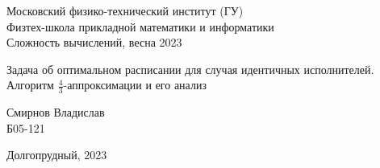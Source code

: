\begin{center}

    \normalsize{Московский физико-технический институт (ГУ)}\\
    \normalsize{Физтех-школа прикладной математики и информатики}\\
    \normalsize{Сложность вычислений, весна 2023}\\
    
    \vspace{15em}
    
    \Large{Задача об оптимальном расписании для случая идентичных исполнителей. Алгоритм $\frac{4}{3}$-аппроксимации и его анализ}\\
    
\end{center}

\vspace{5em}

\begin{flushright} 
    \large{Смирнов Владислав}\\
    \large{Б05-121}
\end{flushright}

\vspace{\fill}

\begin{center} Долгопрудный, 2023 \end{center}
\thispagestyle{empty}